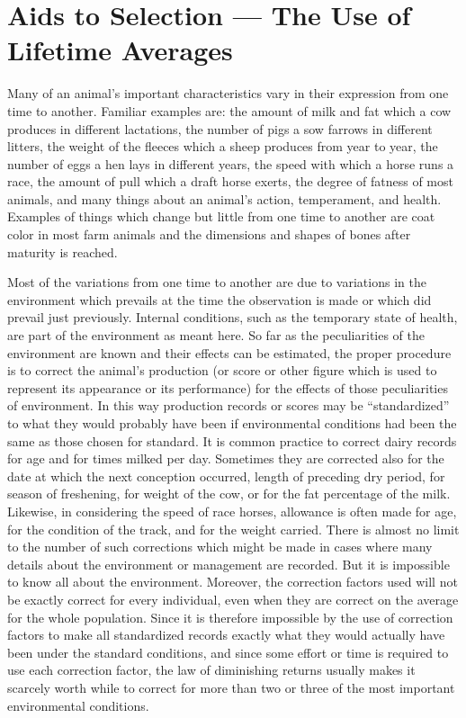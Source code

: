 \chapter{Aids to Selection --- The Use of Lifetime Averages}
\label{cha:Lush_Chapter_13}

Many of an animal's important characteristics vary in their expression
from one time to another. Familiar examples are: the amount of
milk and fat which a cow produces in different lactations, the number
of pigs a sow farrows in different litters, the weight of the fleeces which
a sheep produces from year to year, the number of eggs a hen lays in
different years, the speed with which a horse runs a race, the amount of
pull which a draft horse exerts, the degree of fatness of most animals,
and many things about an animal's action, temperament, and health.
Examples of things which change but little from one time to another
are coat color in most farm animals and the dimensions and shapes of
bones after maturity is reached.

Most of the variations from one time to another are due to variations
in the environment which prevails at the time the observation is
made or which did prevail just previously. Internal conditions, such as
the temporary state of health, are part of the environment as meant
here. So far as the peculiarities of the environment are known and their
effects can be estimated, the proper procedure is to correct the animal's
production (or score or other figure which is used to represent its
appearance or its performance) for the effects of those peculiarities of
environment. In this way production records or scores may be ``standardized''
to what they would probably have been if environmental
conditions had been the same as those chosen for standard. It is common
practice to correct dairy records for age and for times milked per
day. Sometimes they are corrected also for the date at which the next
conception occurred, length of preceding dry period, for season of
freshening, for weight of the cow, or for the fat percentage of the milk.
Likewise, in considering the speed of race horses, allowance is often
made for age, for the condition of the track, and for the weight carried.
There is almost no limit to the number of such corrections which
might be made in cases where many details about the environment or
management are recorded. But it is impossible to know all about the
environment. Moreover, the correction factors used will not be exactly
correct for every individual, even when they are correct on the average
for the whole population. Since it is therefore impossible by the use of
correction factors to make all standardized records exactly what they
would actually have been under the standard conditions, and since
some effort or time is required to use each correction factor, the law of
diminishing returns usually makes it scarcely worth while to correct for
more than two or three of the most important environmental conditions.

